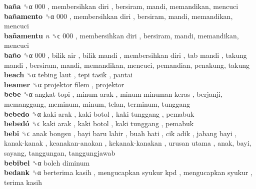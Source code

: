 \textbf{baña} ␝α   000 ,  membersihkan diri , bersiram, mandi, memandikan, mencuci  \\
\textbf{bañamento} ␝α   000 ,  membersihkan diri , bersiram, mandi, memandikan, mencuci  \\
\textbf{bañamentu} \emph{n}  ␝ϲ   000 ,  membersihkan diri , bersiram, mandi, memandikan, mencuci  \\
\textbf{baño} ␝α   000 ,  bilik air ,  bilik mandi ,  membersihkan diri ,  tab mandi ,  takung mandi , bersiram, mandi, memandikan, mencuci, pemandian, penakung, takung  \\
\textbf{beach} ␝α   tebing laut ,  tepi tasik , pantai  \\
\textbf{beamer} ␝α   projektor filem , projektor  \\
\textbf{bebe} ␝α   angkat topi ,  minum arak ,  minum minuman keras , berjanji, memanggang, meminum, minum, telan, terminum, tunggang  \\
\textbf{bebedo} ␝α   kaki arak ,  kaki botol ,  kaki tunggang , pemabuk  \\
\textbf{bebedó} ␝ϲ   kaki arak ,  kaki botol ,  kaki tunggang , pemabuk  \\
\textbf{bebi} ␝ϲ   anak bongsu ,  bayi baru lahir ,  buah hati ,  cik adik ,  jabang bayi ,  kanak-kanak ,  keanakan-anakan ,  kekanak-kanakan ,  urusan utama , anak, bayi, sayang, tanggungan, tanggungjawab  \\
\textbf{bebibel} ␝α   boleh diminum   \\
\textbf{bedank} ␝α   berterima kasih ,  mengucapkan syukur kpd ,  mengucapkan syukur ,  terima kasih   \\
